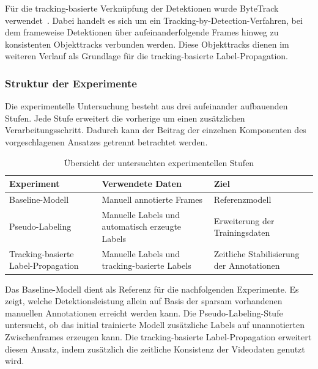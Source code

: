 Für die tracking-basierte Verknüpfung der Detektionen wurde ByteTrack verwendet~\cite{bytetrack}. Dabei handelt es sich um ein Tracking-by-Detection-Verfahren, bei dem frameweise Detektionen über aufeinanderfolgende Frames hinweg zu konsistenten Objekttracks verbunden werden. Diese Objekttracks dienen im weiteren Verlauf als Grundlage für die tracking-basierte Label-Propagation.

\subsubsection{Struktur der Experimente}

Die experimentelle Untersuchung besteht aus drei aufeinander aufbauenden Stufen. Jede Stufe erweitert die vorherige um einen zusätzlichen Verarbeitungsschritt. Dadurch kann der Beitrag der einzelnen Komponenten des vorgeschlagenen Ansatzes getrennt betrachtet werden.

\begin{table}[htbp]
    \centering
    \caption{Übersicht der untersuchten experimentellen Stufen}
    \label{tab:experimentelle_stufen}
    \begin{tabular}{p{3.7cm}p{5.4cm}p{4.0cm}}
        \hline
        \textbf{Experiment}                 & \textbf{Verwendete Daten}                       & \textbf{Ziel}                             \\
        \hline
        Baseline-Modell                     & Manuell annotierte Frames                       & Referenzmodell                            \\
        Pseudo-Labeling                     & Manuelle Labels und automatisch erzeugte Labels & Erweiterung der Trainingsdaten            \\
        Tracking-basierte Label-Propagation & Manuelle Labels und tracking-basierte Labels    & Zeitliche Stabilisierung der Annotationen \\
        \hline
    \end{tabular}
\end{table}

Das Baseline-Modell dient als Referenz für die nachfolgenden Experimente. Es zeigt, welche Detektionsleistung allein auf Basis der sparsam vorhandenen manuellen Annotationen erreicht werden kann. Die Pseudo-Labeling-Stufe untersucht, ob das initial trainierte Modell zusätzliche Labels auf unannotierten Zwischenframes erzeugen kann. Die tracking-basierte Label-Propagation erweitert diesen Ansatz, indem zusätzlich die zeitliche Konsistenz der Videodaten genutzt wird.


